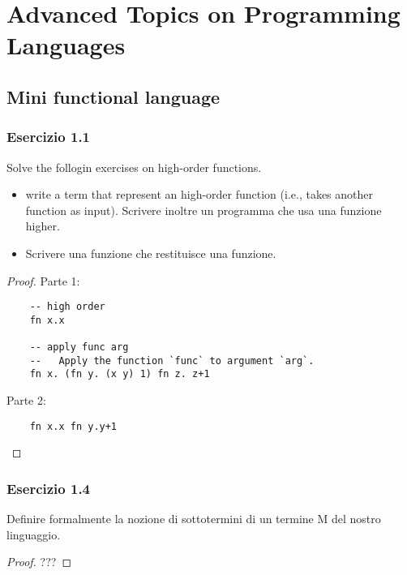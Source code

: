 \documentclass[12pt,a4paper,oneside]{book}
\begin{document}
\chapter{Advanced Topics on Programming Languages}

\section{Mini functional language}

\subsection{Esercizio 1.1}

\begin{exercise}
    Solve the follogin exercises on high-order functions. 
    \begin{itemize}
        \item write a term that represent an high-order function (i.e., takes another function as input). Scrivere inoltre un
        programma che usa una funzione higher.
        \item Scrivere una funzione che restituisce una funzione.
    \end{itemize}

\begin{proof}
    Parte 1:
    \begin{verbatim}
    -- high order
    fn x.x
    
    -- apply func arg
    --   Apply the function `func` to argument `arg`.
    fn x. (fn y. (x y) 1) fn z. z+1
    \end{verbatim}
    
    Parte 2:
    \begin{verbatim}
    fn x.x fn y.y+1
    \end{verbatim}
    
\end{proof}

\end{exercise}

\subsection{Esercizio 1.4}

\begin{exercise}
    Definire formalmente la nozione di sottotermini di un termine M del nostro linguaggio.
    \begin{proof}
        ??? 
    \end{proof}
\end{exercise}
\end{document}
